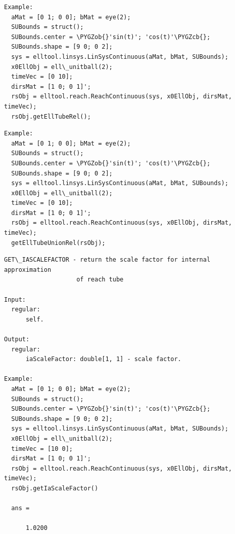 \documentclass[letterpaper,10pt,english]{sphinxmanual}
\def\PYGZob{\char`\{}
\def\PYGZcb{\char`\}}
\begin{document}
\begin{Verbatim}[commandchars=\\\{\}]
Example:
  aMat = [0 1; 0 0]; bMat = eye(2);
  SUBounds = struct();
  SUBounds.center = \PYGZob{}'sin(t)'; 'cos(t)'\PYGZcb{};
  SUBounds.shape = [9 0; 0 2];
  sys = elltool.linsys.LinSysContinuous(aMat, bMat, SUBounds);
  x0EllObj = ell\_unitball(2);
  timeVec = [0 10];
  dirsMat = [1 0; 0 1]';
  rsObj = elltool.reach.ReachContinuous(sys, x0EllObj, dirsMat, timeVec);
  rsObj.getEllTubeRel();
\end{Verbatim}

\begin{Verbatim}[commandchars=\\\{\}]
Example:
  aMat = [0 1; 0 0]; bMat = eye(2);
  SUBounds = struct();
  SUBounds.center = \PYGZob{}'sin(t)'; 'cos(t)'\PYGZcb{};
  SUBounds.shape = [9 0; 0 2];
  sys = elltool.linsys.LinSysContinuous(aMat, bMat, SUBounds);
  x0EllObj = ell\_unitball(2);
  timeVec = [0 10];
  dirsMat = [1 0; 0 1]';
  rsObj = elltool.reach.ReachContinuous(sys, x0EllObj, dirsMat, timeVec);
  getEllTubeUnionRel(rsObj);
\end{Verbatim}

\begin{Verbatim}[commandchars=\\\{\}]
GET\_IASCALEFACTOR - return the scale factor for internal approximation
                    of reach tube

Input:
  regular:
      self.

Output:
  regular:
      iaScaleFactor: double[1, 1] - scale factor.

Example:
  aMat = [0 1; 0 0]; bMat = eye(2);
  SUBounds = struct();
  SUBounds.center = \PYGZob{}'sin(t)'; 'cos(t)'\PYGZcb{};
  SUBounds.shape = [9 0; 0 2];
  sys = elltool.linsys.LinSysContinuous(aMat, bMat, SUBounds);
  x0EllObj = ell\_unitball(2);
  timeVec = [10 0];
  dirsMat = [1 0; 0 1]';
  rsObj = elltool.reach.ReachContinuous(sys, x0EllObj, dirsMat, timeVec);
  rsObj.getIaScaleFactor()

  ans =

      1.0200
\end{Verbatim}
\end{document}
